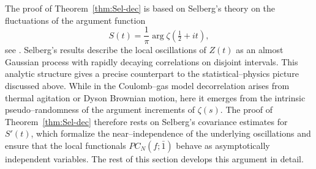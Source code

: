 \documentclass[12pt,reqno]{amsart}
\theoremstyle{plain}
\theoremstyle{definition}
\theoremstyle{remark}
\begin{document}
The proof of Theorem~\ref{thm:Sel-dec} is based on Selberg’s theory on the fluctuations of the argument function
\begin{equation}
S(t)=\frac{1}{\pi}\arg\zeta\!\left(\tfrac{1}{2}+it\right),
\end{equation}
see \cite{Selberg1946,Selberg1947,
Selberg1989CLT,
SelbergCollectedPapers1989}. Selberg's results describe the local oscillations of $Z(t)$ as an almost Gaussian process
with rapidly decaying correlations on disjoint intervals.
This analytic structure gives a precise counterpart to the
statistical--physics picture discussed above. While in the Coulomb--gas model
decorrelation arises from thermal agitation or Dyson Brownian motion,
here it emerges from the intrinsic pseudo--randomness of the argument increments of $\zeta(s)$.
The proof of Theorem~\ref{thm:Sel-dec} therefore rests on Selberg’s covariance estimates for $S'(t)$,
which formalize the near--independence of the underlying oscillations and ensure that the
local functionals $PC_N(f;\bar 1)$ behave as asymptotically independent variables.
The rest of this section develops this argument in detail.
\end{document}
